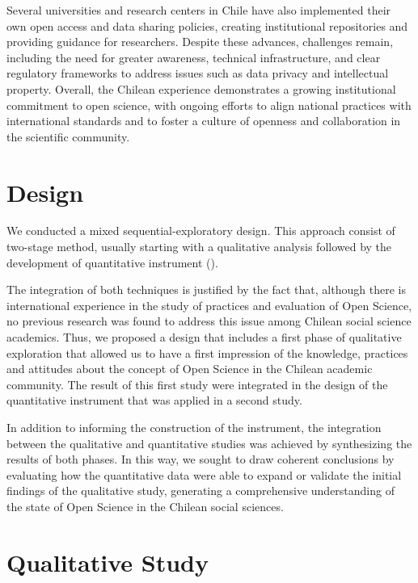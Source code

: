 \documentclass[
  letterpaper,
]{article}
\begin{document}
Several universities and research centers in Chile have also implemented
their own open access and data sharing policies, creating institutional
repositories and providing guidance for researchers. Despite these
advances, challenges remain, including the need for greater awareness,
technical infrastructure, and clear regulatory frameworks to address
issues such as data privacy and intellectual property. Overall, the
Chilean experience demonstrates a growing institutional commitment to
open science, with ongoing efforts to align national practices with
international standards and to foster a culture of openness and
collaboration in the scientific community.

\section{Design}\label{design}

We conducted a mixed sequential-exploratory design. This approach
consist of two-stage method, usually starting with a qualitative
analysis followed by the development of quantitative instrument
().

The integration of both techniques is justified by the fact that,
although there is international experience in the study of practices and
evaluation of Open Science, no previous research was found to address
this issue among Chilean social science academics. Thus, we proposed a
design that includes a first phase of qualitative exploration that
allowed us to have a first impression of the knowledge, practices and
attitudes about the concept of Open Science in the Chilean academic
community. The result of this first study were integrated in the design
of the quantitative instrument that was applied in a second study.

In addition to informing the construction of the instrument, the
integration between the qualitative and quantitative studies was
achieved by synthesizing the results of both phases. In this way, we
sought to draw coherent conclusions by evaluating how the quantitative
data were able to expand or validate the initial findings of the
qualitative study, generating a comprehensive understanding of the state
of Open Science in the Chilean social sciences.

\section{Qualitative Study}\label{qualitative-study}
\end{document}
